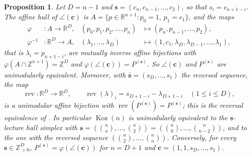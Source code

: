 \documentclass[11pt, a4paper, abstract=yes]{scrartcl}
\theoremstyle{definition}
\theoremstyle{remark}
\theoremstyle{plain}
\newtheorem{proposition}[definition]{Proposition}
\newcommand{\vek}[1]{\boldsymbol{#1}}
\theoremstyle{remark}
\theoremstyle{plain}
\newcommand{\Koz}{\operatorname{Koz}}
\newcommand{\rasimp}{\angle}
\newcommand{\leandiscof}[1]{\tikz[baseline=-0.6ex]\fill[#1] (0,0) circle (0.6ex);}
\newcommand{\leanfull}{\leandiscof{leanfull}}
\newcommand{\leanmark}[1]{\leavevmode{\reversemarginpar\marginnote{\raggedleft#1}}}
\begin{document}
\begin{proposition}
\leanmark{\leanfull}Let \(D=n-1\) and \(\vek s=(c_n,c_{n-1},\dots,c_2)\), so that \(s_i=c_{n+1-i}\). The affine
hull of \(\rasimp(\vek c)\) is \(A=\lbrace p\in\mathbb R^{n+1}:p_0=1,\ p_1=c_1\rbrace\), and the maps
\begin{equation}\label{eq:lh-maps}
\begin{aligned}
  \varphi&\colon A\to\mathbb R^D, & (p_0,p_1,p_2,\dots,p_n)&\mapsto(p_n,p_{n-1},\dots,p_2),\\
  \varphi^{-1}&\colon\mathbb R^D\to A, & (\lambda_1,\dots,\lambda_D)&\mapsto(1,c_1,\lambda_D,\lambda_{D-1},\dots,\lambda_1),
\end{aligned}
\end{equation}
that is \(\lambda_i=p_{n+1-i}\), are mutually inverse affine bijections with
\(\varphi(A\cap\mathbb Z^{n+1})=\mathbb Z^D\) and \(\varphi(\rasimp(\vek c))=P^{(\vek s)}\). So
\(\rasimp(\vek c)\) and \(P^{(\vek s)}\) are unimodularly equivalent. Moreover, with
\(\bar{\vek s}=(s_D,\dots,s_1)\) the reversed sequence, the map
\begin{equation}\label{eq:lh-reversal}
  \operatorname{rev}\colon\mathbb R^D\to\mathbb R^D,\qquad \operatorname{rev}(\lambda)_i=s_{D+1-i}-\lambda_{D+1-i}\quad(1\le i\le D),
\end{equation}
is a unimodular affine bijection with \(\operatorname{rev}(P^{(\vek s)})=P^{(\bar{\vek s})}\); this is the
reversal equivalence of \autocite{HibiOlsenTsuchiya2018}. In particular \(\Koz(n)\) is unimodularly
equivalent to the \(\vek s\)-lecture hall simplex with
\(\vek s=(\binom nn,\dots,\binom n2)=(\binom n0,\dots,\binom n{n-2})\), and to the one with the
reversed sequence \((\binom n2,\dots,\binom nn)\). Conversely, for every \(\vek s\in\mathbb Z_{>0}^D\),
\(P^{(\vek s)}=\varphi(\rasimp(\vek c))\) for \(n=D+1\) and \(\vek c=(1,1,s_D,\dots,s_1)\).
\label{prop-lecture-hall}
\end{proposition}
\end{document}
